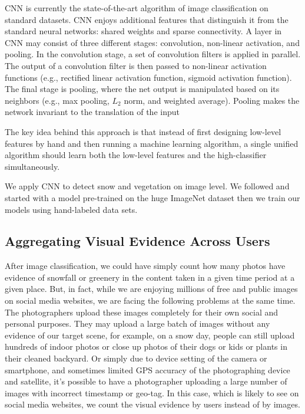 CNN is currently the state-of-the-art algorithm of image classification on standard datasets.
CNN enjoys additional features that distinguish it from the standard neural networks: 
shared weights and sparse connectivity.
A layer in CNN may consist of three different stages: 
convolution, non-linear activation, and pooling.
In the convolution stage, a set of convolution filters is applied in parallel. 
The output of a convolution filter is then passed to non-linear activation functions 
(e.g., rectified linear activation function, sigmoid activation function).
The final stage is pooling, where the net output is manipulated based on its neighbors 
(e.g., max pooling, $L_2$ norm, and weighted average).
Pooling makes the network invariant to the translation of the input

The key idea behind this approach is that instead of first designing low-level features by
hand and then running a machine learning algorithm, a single unified
algorithm should learn both the low-level features and the
high-classifier simultaneously. 

We apply CNN to detect snow and vegetation on image level. 
We followed  and started with a model pre-trained on the huge 
ImageNet dataset then we train our models using hand-labeled data sets.

\subsection{Aggregating Visual Evidence Across Users}
After image classification, we could have simply count how many photos have evidence of snowfall 
or greenery in the content taken in a given time period at a given place. But, in fact, while we are 
enjoying millions of free and public images on social media websites, we are facing the following problems 
at the same time. The photographers upload these images completely for their own social and personal purposes. 
They may upload a large batch of images without any evidence of our target scene, for example, 
on a snow 
day, people can still upload hundreds of indoor photos or close up photos of their dogs or kids or plants 
in their cleaned backyard. 
Or simply due to device setting of the camera or smartphone, and sometimes limited GPS accuracy of the photographing 
device and satellite, it's possible 
to have a photographer uploading a large number of images with incorrect timestamp or geo-tag.
In this case, which is likely to see on social media websites, we count the visual evidence 
by users instead of by images.

